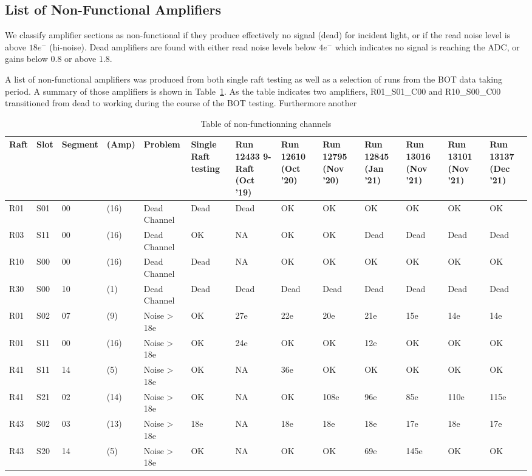 \subsection{List of Non-Functional Amplifiers}\label{deadamplifiers}

We classify amplifier sections as non-functional if they produce effectively no signal (dead) for incident light, or if the read noise level is above $18e^{-}$ (hi-noise).  Dead amplifiers are found with either read noise levels below $4e^{-}$ which indicates no signal is reaching the ADC, or gains below $0.8$ or above $1.8$. 

A list of non-functional amplifiers was produced from both single raft testing as well as a selection of runs from the BOT data taking period. A summary of those amplifiers is shown in Table~\ref{tab-BOTdeadamp}. As the table indicates two amplifiers, R01\_S01\_C00 and R10\_S00\_C00 transitioned from dead to working during the course of the BOT testing. Furthermore another 

\begin{table}[!ht]
    \centering
    \begin{tabular}{|l|l|l|l|l|l|l|l|l|l|l|l|l|}
    \hline
        Raft & Slot & Segment & (Amp) & Problem & Single Raft testing & Run 12433 9-Raft (Oct '19) & Run 12610 (Oct '20) & Run 12795 (Nov '20) & Run 12845 (Jan '21) & Run 13016 (Nov '21) & Run 13101 (Nov '21) & Run 13137 (Dec '21) \\ \hline
        R01 & S01 & 00 & (16) & Dead Channel & Dead & Dead & OK & OK & OK & OK & OK & OK \\ \hline
        R03 & S11 & 00 & (16) & Dead Channel & OK & NA & OK & OK & Dead & Dead & Dead & Dead \\ \hline
        R10 & S00 & 00 & (16) & Dead Channel & Dead & NA & OK & OK & OK & OK & OK & OK \\ \hline
        R30 & S00 & 10 & (1) & Dead Channel & Dead & Dead & Dead & Dead & Dead & Dead & Dead & Dead \\ \hline
        R01 & S02 & 07 & (9) & Noise > 18e & OK & 27e & 22e & 20e & 21e & 15e & 14e & 14e \\ \hline
        R01 & S11 & 00 & (16) & Noise > 18e & OK & 24e & OK & OK & 12e & OK & OK & OK \\ \hline
        R41 & S11 & 14 & (5) & Noise > 18e & OK & NA & 36e & OK & OK & OK & OK & OK \\ \hline
        R41 & S21 & 02 & (14) & Noise > 18e & OK & NA & OK & 108e & 96e & 85e & 110e & 115e \\ \hline
        R43 & S02 & 03 & (13) & Noise > 18e & 18e & NA & 18e & 18e & 18e & 17e & 18e & 17e \\ \hline
        R43 & S20 & 14 & (5) & Noise > 18e & OK & NA & OK & OK & 69e & 145e & OK & OK \\ \hline

    \end{tabular}
    \caption{Table of non-functionning channels \label{tab-BOTdeadamp}}
\end{table}


